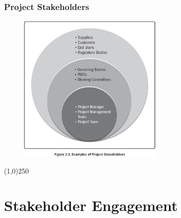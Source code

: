 \begin{frame}
\frametitle{Project Stakeholders}
 \begin{figure}
    \centering
        \includegraphics[width = 7cm]{../images/guide/Fig2-2.jpg}
    \label{guidefig:2-2}
 \end{figure}
\end{frame}
\begin{center}\line(1,0){250}\end{center}


\section{Stakeholder Engagement}


